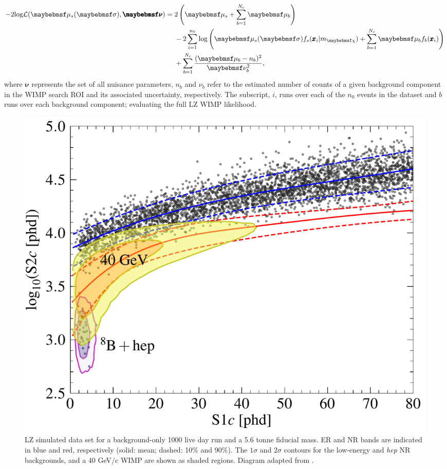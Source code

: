 %
\begin{equation}
    \begin{split}
    - 2\MathText{log}\mathcal{L}(\mu_{s}(\sigma), \pmb{\nu}) = \; &2\left(\mu_{s} + \sum_{b=1}^{N_{c}}\mu_{b} \right) \\
    &- 2\sum_{i=1}^{n_{0}} \MathText{log} \left( \mu_{s}(\sigma)f_s(\pmb{x}_{i}|m_{\chi})
    + \sum_{b=1}^{N_{c}} \mu_{b}f_{b}(\pmb{x}_{i}) \right) \\
    &+ \sum_{b=1}^{N_{c}} \frac{(\mu_{b}-n_{b})^{2}}{\nu_{b}^{2}},
    \end{split}
    \label{eq:full_lz_likelihood}
\end{equation}
%
where $\pmb{\nu}$ represents the set of all nuisance parameters, $n_{b}$ and $\nu_{b}$ refer to the estimated number of counts of a given background component in the WIMP search ROI and its associated uncertainty, respectively. The subscript, $i$, runs over each of the $n_{0}$ events in the dataset and $b$ runs over each background component; evaluating the full LZ WIMP likelihood.  

\begin{figure}[h!]
    \centering
    \includegraphics[scale=0.6]{Chapter_5/Figures/sensitivity_studies/background_with_40_gev_wimp.pdf}
    \caption[LZ simulated data set for a background-only 1000 live day run and a 5.6 tonne fiducial mass.]%
    {LZ simulated data set for a background-only 1000 live day run and a 5.6 tonne fiducial mass. ER and NR bands are indicated in blue and red, respectively (solid: mean; dashed: 10\% and 90\%). The $1\sigma$ and $2\sigma$ contours for the low-energy \BE{} and \textit{hep} NR backgrounds, and a 40 GeV/c\squared{} WIMP are shown as shaded regions. Diagram adapted from \cite{akerib2018projected}.}
    \label{fig:lz_1000_day_run}
\end{figure}
%

